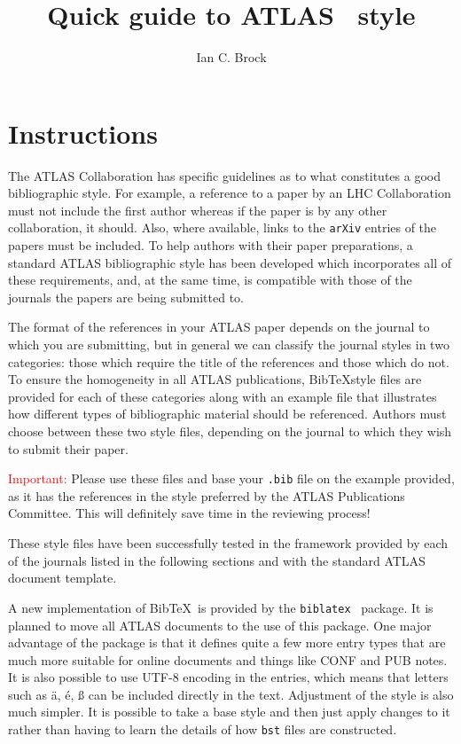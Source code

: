 \documentclass[UKenglish]{style/atlasdoc}
\title{Quick guide to ATLAS \BibTeX\ style}
\author{Ian C. Brock}
\affil{University of Bonn}
\newcommand*{\BibTeX}{Bib\TeX}
\begin{document}
 


\section{Instructions}

The ATLAS Collaboration has specific guidelines as to what constitutes a good bibliographic style. 
For example, a reference to a paper by an LHC Collaboration must not include the first author whereas if the paper is by any other collaboration, it should. 
Also, where available, links to the \texttt{arXiv} entries of the papers must be included. 
To help authors with their paper preparations, a standard ATLAS bibliographic style has been developed which incorporates all of these requirements, 
and, at the same time, is compatible with those of the journals the papers are being submitted to. 

The format of the references in your ATLAS paper depends on the journal to which you are submitting,
but in general we can classify the journal styles in two categories: those which require the title of the references and those which do not. 
To ensure the homogeneity in all ATLAS publications, 
\BibTeX style files are provided for each of these categories along with an example file that illustrates how different types of bibliographic material should be referenced.
Authors must choose between these two style files, depending on the journal to which they wish to submit their paper.

\textcolor{red}{Important:} Please use these files and base your \texttt{.bib} file on the example provided,
as it has the references in the style preferred by the ATLAS Publications Committee.
This will definitely save time in the reviewing process!

These style files have been successfully tested in the framework provided by each of the journals listed in the following sections and with the standard ATLAS document template.

A new implementation of \BibTeX\ is provided by the \texttt{biblatex}~\cite{biblatex} package.
It is planned to move all ATLAS documents to the use of this package.
One major advantage of the package is that it defines quite a few more entry types
that are much more suitable for online documents and things like CONF and PUB notes.
It is also possible to use UTF-8 encoding in the entries, which means that letters such as
ä, é, ß can be included directly in the text.
Adjustment of the style is also much simpler.
It is possible to take a base style and then just apply changes to it rather than
having to learn the details of how \texttt{bst} files are constructed.
\end{document}
